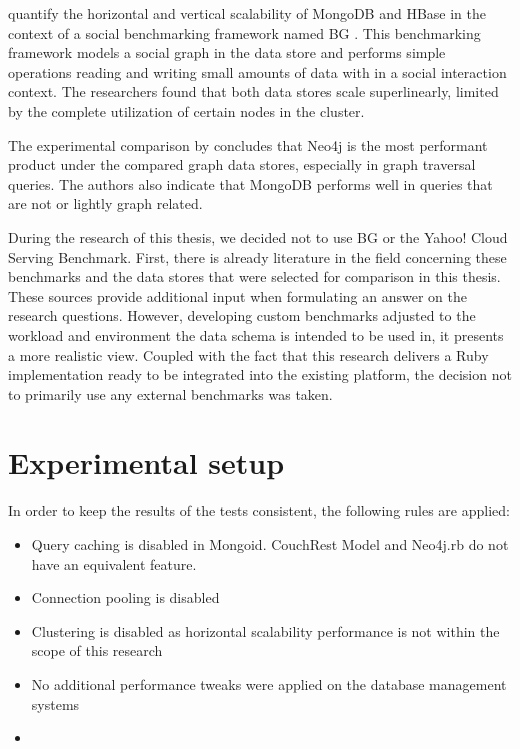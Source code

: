 \textcite{Barahmand2015} quantify the horizontal and vertical scalability of MongoDB and HBase in the context of a social benchmarking framework named BG \autocite{Barahmand2013}.
This benchmarking framework models a social graph in the data store and performs simple operations reading and writing small amounts of data with in a social interaction context.
The researchers found that both data stores scale superlinearly, limited by the complete utilization of certain nodes in the cluster.

The experimental comparison by \textcite{Kolomivcenko2013} concludes that Neo4j is the most performant product under the compared graph data stores, especially in graph traversal queries.
The authors also indicate that MongoDB performs well in queries that are not or lightly graph related.

During the research of this thesis, we decided not to use BG or the Yahoo! Cloud Serving Benchmark.
First, there is already literature in the field concerning these benchmarks and the data stores that were selected for comparison in this thesis.
These sources provide additional input when formulating an answer on the research questions.
However, developing custom benchmarks adjusted to the workload and environment the data schema is intended to be used in, it presents a more realistic view.
Coupled with the fact that this research delivers a Ruby implementation ready to be integrated into the existing platform, the decision not to primarily use any external benchmarks was taken.

\section{Experimental setup}
\label{sec:experimental-setup}

In order to keep the results of the tests consistent, the following rules are applied:

\begin{itemize}
  \item Query caching is disabled in Mongoid. CouchRest Model and Neo4j.rb do not have an equivalent feature.
  \item Connection pooling is disabled
  \item Clustering is disabled as horizontal scalability performance is not within the scope of this research
  \item No additional performance tweaks were applied on the database management systems
  \item {}
\end{itemize}

